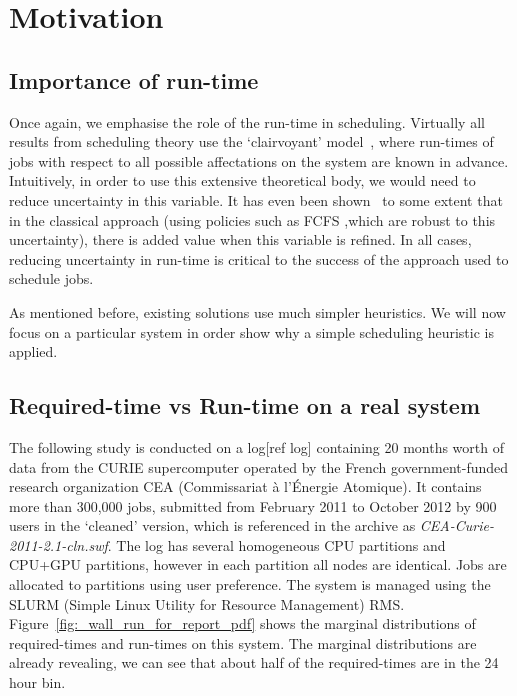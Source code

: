 \documentclass{article}
\begin{document}
\section{Motivation}

\subsection{Importance of run-time}
\label{sub:importance_of_run-time}
Once again, we emphasise the role of the run-time in scheduling. Virtually all results from scheduling theory use the `clairvoyant' model~\cite{handbook-of-scheduling}, where run-times of jobs with respect to all possible affectations on the system are known in advance.
Intuitively, in order to use this extensive theoretical body, we would need to reduce uncertainty in this variable.
It has even been shown~\cite{tsafir} to some extent that in the classical approach (using policies such as FCFS ,which are robust to this uncertainty), there is added value when this variable is refined.
In all cases, reducing uncertainty in run-time is critical to the success of the approach used to schedule jobs.

As mentioned before, existing solutions use much simpler heuristics. We will now focus on a particular system in order show why a simple scheduling heuristic is applied.

\subsection{Required-time vs Run-time on a real system}
\label{sub:required-time_vs_run-time_on_a_real_system}
The following study is conducted on a log[ref log] containing 20 months worth of data from the CURIE supercomputer operated by the French government-funded research organization CEA (Commissariat à l'Énergie Atomique).
It contains more than 300,000 jobs, submitted from February 2011 to October 2012 by 900 users in the `cleaned' version, which is referenced in the archive as \textit{CEA-Curie-2011-2.1-cln.swf}.
The log has several homogeneous CPU partitions and CPU+GPU partitions, however in each partition all nodes are identical.
Jobs are allocated to partitions using user preference. The system is managed using the SLURM (Simple Linux Utility for Resource Management) RMS.
Figure~\ref{fig:_wall_run_for_report_pdf} shows the marginal distributions of required-times and run-times on this system. The marginal distributions are already revealing, we can see that about half of the required-times are in the 24 hour bin.
\end{document}
